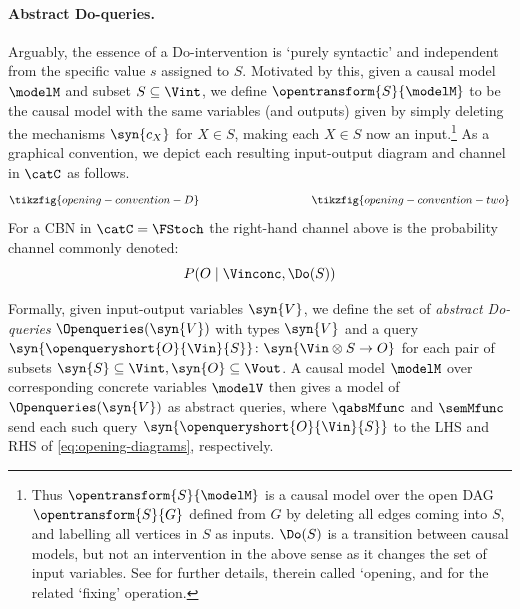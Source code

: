\documentclass{article}
\begin{document}
\paragraph{Abstract Do-queries.} Arguably, the essence of a Do-intervention is `purely syntactic' and independent from the specific value $s$ assigned to $S$. Motivated by this, given a causal model $\modelM$ and subset \st{$S \subseteq \Vint$}, we define $\opentransform{S}{\modelM}$ to be the causal model with the same variables (and outputs) given by simply deleting the mechanisms $\syn{c_X}$ for $X \in S$, making each $X \in S$ now an input.\footnote{Thus $\opentransform{S}{\modelM}$ is a causal model over the open DAG $\opentransform{S}{G}$ defined from $G$ by deleting all edges coming into $S$, and labelling all vertices in $S$ as inputs. $\Do(S)$ is a transition between causal models, but not an intervention in the above sense as it changes the set of input variables. See \cite{lorenz2023causal} for further details, therein called `opening, and \cite{richardson2023nested} for the related `fixing' operation.} 
As a graphical convention, we depict each resulting input-output diagram and channel in $\catC$ as follows.
\begin{equation} \label{eq:opening-diagrams}
\tikzfig{opening-convention-D}
\qquad \qquad \qquad \qquad \qquad 
\tikzfig{opening-convention-two}
\end{equation}
For a CBN in $\catC=\FStoch$ the right-hand channel above is the probability channel commonly denoted: 
\begin{equation} \label{eq:P-Do}
P(O \mid \Vinconc, \Do(S))
\end{equation}


Formally, given input-output variables $\syn{V}$, we define the set of \emph{abstract Do-queries} $\Openqueries(\syn{V})$ with types $\syn{V}$ and a query $\syn{\openqueryshort{O}{\Vin}{S}} \colon \syn{\Vin \otimes S \to O}$ for each pair of subsets \st{$\syn{S} \subseteq \Vint, \syn{O} \subseteq \Vout$}. 
A causal model $\modelM$ over corresponding concrete variables $\modelV$ then gives a model of $\Openqueries(\syn{V})$ as abstract queries, where $\qabsMfunc$ and $\semMfunc$ send each such query $\syn{\openqueryshort{O}{\Vin}{S}}$ to the LHS and RHS of \eqref{eq:opening-diagrams}, respectively. 
\end{document}
